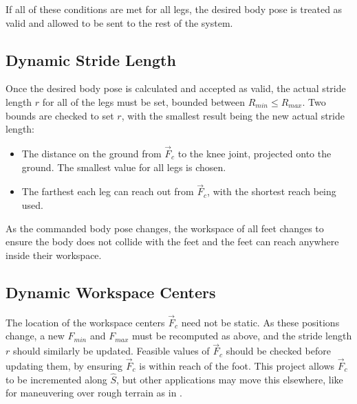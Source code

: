 If all of these conditions are met for all legs, the desired body pose is treated as valid and allowed to be sent to the rest of the system. 

\subsection{ Dynamic Stride Length }

Once the desired body pose is calculated and accepted as valid, the actual stride length $r$ for all of the legs must be set, bounded between $R_{min} \le R_{max}$. Two bounds are checked to set $r$, with the smallest result being the new actual stride length:

\begin{itemize}
    \item The distance on the ground from $\vec{F}_c$ to the knee joint, projected onto the ground. The smallest value for all legs is chosen.

    \item The farthest each leg can reach out from $\vec{F}_c$, with the shortest reach being used. 
\end{itemize}

As the commanded body pose changes, the workspace of all feet changes to ensure the body does not collide with the feet and the feet can reach anywhere inside their workspace. 

\subsection{ Dynamic Workspace Centers }
The location of the workspace centers $\vec{F}_c$ need not be static. As these positions change, a new $F_{min}$ and $F_{max}$ must be recomputed as above, and the stride length $r$ should similarly be updated. Feasible values of $\vec{F}_c$ should be checked before updating them, by ensuring $\vec{F}_c$ is within reach of the foot. This project allows $\vec{F}_c$ to be incremented along $\hat{S}$, but other applications may move this elsewhere, like for maneuvering over rough terrain as in \cite{foot_placement}. 



